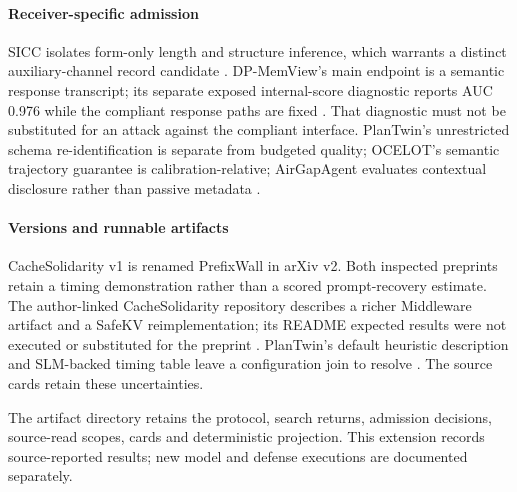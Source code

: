 \paragraph{Receiver-specific admission}
SICC isolates form-only length and structure inference, which warrants a distinct auxiliary-channel record candidate \cite[Table~3]{xu2026sicc}. DP-MemView's main endpoint is a semantic response transcript; its separate exposed internal-score diagnostic reports AUC 0.976 while the compliant response paths are fixed \cite[RQ2, after Table~4]{dpmemview2026}. That diagnostic must not be substituted for an attack against the compliant interface. PlanTwin's unrestricted schema re-identification is separate from budgeted quality; OCELOT's semantic trajectory guarantee is calibration-relative; AirGapAgent evaluates contextual disclosure rather than passive metadata \cite{yu2026plantwin,xie2026ocelot,bagdasarian2024airgap}.

\paragraph{Versions and runnable artifacts}
CacheSolidarity v1 is renamed PrefixWall in arXiv v2. Both inspected preprints retain a timing demonstration rather than a scored prompt-recovery estimate. The author-linked CacheSolidarity repository describes a richer Middleware artifact and a SafeKV reimplementation; its README expected results were not executed or substituted for the preprint \cite{pennas2026cachesolidarity}. PlanTwin's default heuristic description and SLM-backed timing table leave a configuration join to resolve \cite[5.1,5.4]{yu2026plantwin}. The source cards retain these uncertainties.

\onecolumn
\begingroup
\renewcommand{\arraystretch}{0.96}

\endgroup
\twocolumn

The artifact directory  retains the protocol, search returns, admission decisions, source-read scopes, cards and deterministic projection. This extension records source-reported results; new model and defense executions are documented separately.
